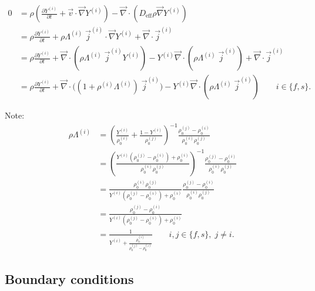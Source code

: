 \documentclass[12pt]{report}
\begin{document}
\begin{equation}
  \begin{aligned}
    0 &=
    \rho \left(
    \frac{\partial Y^{(i)}}{\partial t} +
    \vec{v} \cdot \vec{\nabla} Y^{(i)}
    \right)
    -
    \vec{\nabla} \cdot (D_{\textrm{eff}} \rho \vec{\nabla} Y^{(i)}) \\
    &=
    \rho
    \frac{\partial Y^{(i)}}{\partial t} +
    \rho \Lambda^{(i)} \; \vec{j}^{(i)} \cdot \vec{\nabla} Y^{(i)}
    +
    \vec{\nabla} \cdot \vec{j}^{(i)} \\
    &=
    \rho
    \frac{\partial Y^{(i)}}{\partial t} +
    \vec{\nabla} \cdot
    (\rho \Lambda^{(i)} \; \vec{j}^{(i)} Y^{(i)}) -
    Y^{(i)} \vec{\nabla} \cdot
    (\rho \Lambda^{(i)} \; \vec{j}^{(i)}) +
    \vec{\nabla} \cdot \vec{j}^{(i)}
    \\
    &=
    \rho
    \frac{\partial Y^{(i)}}{\partial t} +
    \vec{\nabla} \cdot
    \Big(
    (1 + \rho^{(i)} \Lambda^{(i)}) \;
    \vec{j}^{(i)} \Big) -
    Y^{(i)} \vec{\nabla} \cdot
    (\rho \Lambda^{(i)} \; \vec{j}^{(i)})
    \qquad i \in \{f,s\}.
  \end{aligned}
\end{equation}

Note:
\begin{equation}
  \begin{aligned}
    \rho \Lambda^{(i)} &=
    \left(
    \frac{Y^{(i)}}{\rho^{(i)}_0} +
    \frac{1 - Y^{(i)}}{\rho^{(j)}_0}
    \right)^{-1}
    \frac{\rho^{(j)}_0 - \rho^{(i)}_0}{\rho^{(i)}_0\rho^{(j)}_0} \\
    &=
    \left(
    \frac{Y^{(i)} (\rho^{(j)}_0 - \rho^{(i)}_0) + \rho^{(i)}_0}{\rho^{(i)}_0 \rho^{(j)}_0}
    \right)^{-1}
    \frac{\rho^{(j)}_0 - \rho^{(i)}_0}{\rho^{(i)}_0\rho^{(j)}_0}
    \\
    &=
    \frac{\rho^{(i)}_0 \rho^{(j)}_0}{Y^{(i)} (\rho^{(j)}_0 - \rho^{(i)}_0) + \rho^{(i)}_0}
    \frac{\rho^{(j)}_0 - \rho^{(i)}_0}{\rho^{(i)}_0\rho^{(j)}_0}
    \\
    &=
    \frac{\rho^{(j)}_0 - \rho^{(i)}_0}{Y^{(i)} (\rho^{(j)}_0 - \rho^{(i)}_0) + \rho^{(i)}_0}
    \\
    &=
    \frac{1}{Y^{(i)} + \frac{\rho^{(i)}_0}{\rho^{(j)}_0 - \rho^{(i)}_0}}
    \qquad i,j \in \{f,s\}, \; j \ne i.
  \end{aligned}
\end{equation}

\subsection{Boundary conditions}
\end{document}
